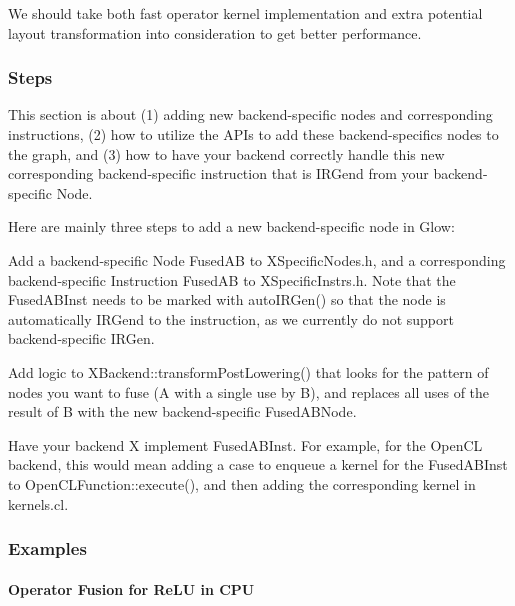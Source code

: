 We should take both fast operator kernel implementation and extra potential layout transformation into consideration to get better performance.

\subsubsection*{Steps}

This section is about (1) adding new backend-\/specific nodes and corresponding instructions, (2) how to utilize the A\+P\+Is to add these backend-\/specifics nodes to the graph, and (3) how to have your backend correctly handle this new corresponding backend-\/specific instruction that is I\+R\+Gen\textquotesingle{}d from your backend-\/specific Node.

Here are mainly three steps to add a new backend-\/specific node in Glow\+:


\begin{DoxyEnumerate}
\item Add a backend-\/specific Node {\ttfamily Fused\+AB} to {\ttfamily X\+Specific\+Nodes.\+h}, and a corresponding backend-\/specific Instruction {\ttfamily Fused\+AB} to {\ttfamily X\+Specific\+Instrs.\+h}. Note that the {\ttfamily Fused\+A\+B\+Inst} needs to be marked with {\ttfamily auto\+I\+R\+Gen()} so that the node is automatically I\+R\+Gen\textquotesingle{}d to the instruction, as we currently do not support backend-\/specific I\+R\+Gen.
\item Add logic to {\ttfamily X\+Backend\+::transform\+Post\+Lowering()} that looks for the pattern of nodes you want to fuse ({\ttfamily A} with a single use by {\ttfamily B}), and replaces all uses of the result of B with the new backend-\/specific {\ttfamily Fused\+A\+B\+Node}.
\item Have your backend {\ttfamily X} implement {\ttfamily Fused\+A\+B\+Inst}. For example, for the Open\+CL backend, this would mean adding a case to enqueue a kernel for the {\ttfamily Fused\+A\+B\+Inst} to {\ttfamily Open\+C\+L\+Function\+::execute()}, and then adding the corresponding kernel in {\ttfamily kernels.\+cl}.
\end{DoxyEnumerate}

\subsubsection*{Examples}

\paragraph*{Operator Fusion for Re\+LU in C\+PU}

